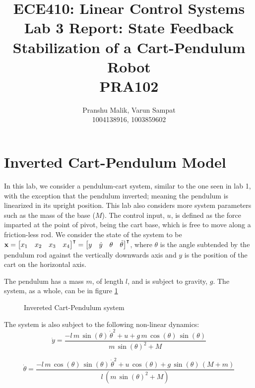 \documentclass[10pt]{article}
\date{}
\begin{document}
\title{\textbf{\Large{\textsc{ECE410:} Linear Control Systems}} \\ \Large{Lab 3 Report: State Feedback Stabilization of a Cart-Pendulum Robot} \\ \textbf{\small{PRA102}}\vspace{-0.3cm}}
\author{Pranshu Malik, Varun Sampat \\ \footnotesize{1004138916}, \footnotesize{1003859602}\vspace{-3cm}}

\maketitle

\section{Inverted Cart-Pendulum Model}
In this lab, we consider a pendulum-cart system, similar to the one seen in lab 1, with the exception that the pendulum inverted; meaning the pendulum is linearized in its upright position. This lab also considers more system parameters such as the mass of the base ($M$). The control input, $u$, is defined as the force imparted at the point of pivot, being the cart base, which is free to move along a friction-less rod. We consider the state of the system to be $\mathbf{x} = \begin{bmatrix} x_1 & x_2 & x_3 & x_4 \end{bmatrix}^\intercal = \begin{bmatrix} y & \dot{y} & \theta & \dot{\theta} \end{bmatrix}^\intercal$, where $\theta$ is the angle subtended by the pendulum rod against the vertically downwards axis and $y$ is the position of the cart on the horizontal axis. 

The pendulum has a mass $m$, of length $l$, and is subject to gravity, $g$. The system, as a whole, can be in figure \ref{fig:inverted_pend}

\begin{figure}[!h]
\centering
\invertedpendcart
\caption{Invereted Cart-Pendulum system}
\label{fig:inverted_pend}
\end{figure}

The system is also subject to the following non-linear dynamics:
\begin{equation}
    \dot{y} = \frac{-l\,m\,\sin\left(\theta\right)\,{\dot{\theta}}^2+u+g\,m\,\cos\left(\theta\right)\,\sin\left(\theta\right)}{m\,{\sin\left(\theta\right)}^2+M}
\end{equation}

\begin{equation}
    \dot{\theta} = \frac{-l\,m\,\cos\left(\theta\right)\,\sin\left(\theta\right)\,{\dot{\theta}}^2+u\,\cos\left(\theta\right)+g\,\sin\left(\theta\right)\,\left(M+m\right)}{l\,\left(m\,{\sin\left(\theta\right)}^2+M\right)}
\end{equation}
\end{document}
